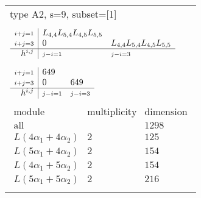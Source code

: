 \documentclass[crop,border=2mm]{standalone}
\begin{document}
\begin{tabular}{l}
{\huge type A2, s=9, subset=[1]}\\ \\


$\displaystyle
\begin{array}{r|l l}
	{\scriptstyle i+j=1}&L_{4,4}L_{5,4}L_{4,5}L_{5,5}&\\
	{\scriptstyle i+j=3}&0&L_{4,4}L_{5,4}L_{4,5}L_{5,5}\\
	\hline h^{i,j}&{\scriptstyle j-i=1}&{\scriptstyle j-i=3}
\end{array}
$ \\ \\


$\displaystyle
\begin{array}{r|l l}
	{\scriptstyle i+j=1}&649&\\
	{\scriptstyle i+j=3}&0&649\\
	\hline h^{i,j}&{\scriptstyle j-i=1}&{\scriptstyle j-i=3}
\end{array}
$ \\ \\


$\displaystyle
\begin{array}{rll}
	\text{module}&\text{multiplicity}&\text{dimension} \\ \hline \text{all}&&1298 \\
	L\left( 4\alpha_{1}+ 4\alpha_{2}\right)&2&125\\
	L\left( 5\alpha_{1}+ 4\alpha_{2}\right)&2&154\\
	L\left( 4\alpha_{1}+ 5\alpha_{2}\right)&2&154\\
	L\left( 5\alpha_{1}+ 5\alpha_{2}\right)&2&216
\end{array}
$ \\ \\

\end{tabular}
\end{document}
